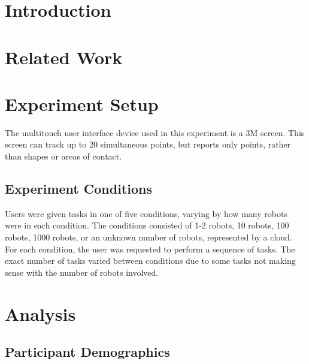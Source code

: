 \documentclass[]{article}
\title{}
\author{}
\begin{document}
\maketitle

\begin{abstract}

\end{abstract}

\section{Introduction}

\section{Related Work}

\section{Experiment Setup}


The multitouch user interface device used in this experiment is a 3M  screen. 
This screen can track up to 20 simultaneous points, but reports only points, rather than shapes or areas of contact. 


\subsection{Experiment Conditions}

Users were given tasks in one of five conditions, varying by how many robots were in each condition. 
The conditions consisted of 1-2 robots, 10 robots, 100 robots, 1000 robots, or an unknown number of robots, represented by a cloud. 
For each condition, the user was requested to perform a sequence of tasks. 
The exact number of tasks varied between conditions due to some tasks not making sense with the number of robots involved. 



\section{Analysis}

\subsection{Participant Demographics}
\end{document}

